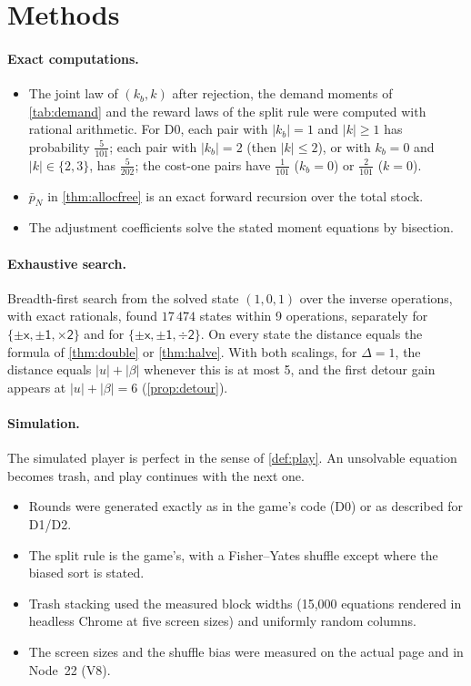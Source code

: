 \documentclass[11pt,a4paper]{article}
\theoremstyle{definition}
\theoremstyle{remark}
\newcommand{\dbl}{\ensuremath{\mathord{\times}\mathsf{2}}}
\newcommand{\hlv}{\ensuremath{\mathord{\div}\mathsf{2}}}
\newcommand{\abs}[1]{\lvert #1\rvert}
\begin{document}
\appendix
\section{Methods}\label{app:methods}

\paragraph{Exact computations.}
\begin{itemize}[nosep]
\item The joint law of $(k_b,k)$ after rejection, the demand moments of
  \cref{tab:demand} and the reward laws of the split rule were computed with rational
  arithmetic. For D0, each pair with $\abs{k_b}=1$ and $\abs k\ge1$ has probability $\frac5{101}$;
  each pair with $\abs{k_b}=2$ (then $\abs k\le2$), or with $k_b=0$ and $\abs k\in\{2,3\}$,
  has $\frac5{202}$; the cost-one pairs have $\frac1{101}$ ($k_b=0$) or $\frac2{101}$
  ($k=0$).
\item $\bar p_N$ in \cref{thm:allocfree} is an exact forward recursion over the total stock.
\item The adjustment coefficients solve the stated moment equations by bisection.
\end{itemize}

\paragraph{Exhaustive search.} Breadth-first search from the solved state $(1,0,1)$ over
the inverse operations, with exact rationals, found $17\,474$ states within 9 operations,
separately for $\{\pm\mathsf x,\pm\mathsf 1,\dbl\}$ and for
$\{\pm\mathsf x,\pm\mathsf 1,\hlv\}$. On every state the distance equals the formula of
\cref{thm:double} or \cref{thm:halve}. With both scalings, for $\Delta=1$, the distance
equals $\abs u+\abs\beta$ whenever this is at most 5, and the first detour gain appears
at $\abs u+\abs\beta=6$ (\cref{prop:detour}).

\paragraph{Simulation.} The simulated player is perfect in the sense of \cref{def:play}.
An unsolvable equation becomes trash, and play continues with the next one.
\begin{itemize}[nosep]
\item Rounds were generated exactly as in the game's code (D0) or as described for D1/D2.
\item The split rule is the game's, with a Fisher--Yates shuffle except where the biased
  sort is stated.
\item Trash stacking used the measured block widths (15{,}000 equations rendered in
  headless Chrome at five screen sizes) and uniformly random columns.
\item The screen sizes and the shuffle bias were measured on the actual page and in
  Node~22 (V8).
\end{itemize}
\end{document}
